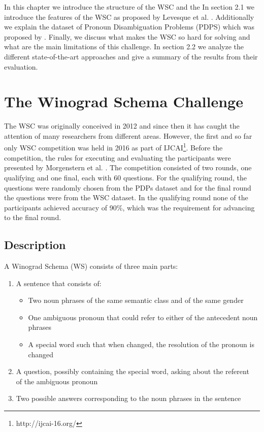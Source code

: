  In this chapter we introduce the structure of the WSC and the  
 In section 2.1 we introduce the features of the WSC as proposed by Levesque et al. \cite{DBLP:conf/kr/LevesqueDM12}. Additionally we explain the dataset of Pronoun Disambiguation Problems (PDPS) which was proposed by \cite{DBLP:conf/aaai/MorgensternO15}. Finally, we discuss what makes the WSC so hard for solving and what are the main limitations of this challenge. In section 2.2 we analyze the different state-of-the-art approaches and give a summary of the results from their evaluation.
 

\section{The Winograd Schema Challenge}
\label{section:TheWinogradSchemaChallenge}

The WSC was originally conceived in 2012 \cite{DBLP:conf/kr/LevesqueDM12} and since then it has caught the  attention of many researchers from different areas. However, the first and so far only WSC competition was held in 2016 as part of IJCAI\footnote{http://ijcai-16.org/}. Before the competition, the rules for executing and evaluating the participants were presented by Morgenstern et al. \cite{DBLP:journals/aim/MorgensternDO16}. The competition consisted of two rounds, one qualifying and one final, each with 60 questions. For the qualifying round, the questions were randomly chosen from the PDPs dataset and for the final round the questions were from the WSC dataset. In the qualifying round none of the participants achieved accuracy of 90\%, which was the requirement for advancing to the final round. 


\subsection{Description}
A Winograd Schema (WS) consists of three main parts:

\begin{enumerate}
	\item A sentence that consists of:
	\begin{itemize}
		\item Two noun phrases of the same semantic class and of the same gender
		\item One ambiguous pronoun that could refer to either of the antecedent noun phrases
		\item A special word such that when changed, the resolution of the pronoun is changed
	\end{itemize}
    \item A question, possibly containing the special word, asking about the referent \\of the ambiguous pronoun
    \item Two possible answers corresponding to the noun phrases in the sentence
\end{enumerate}

